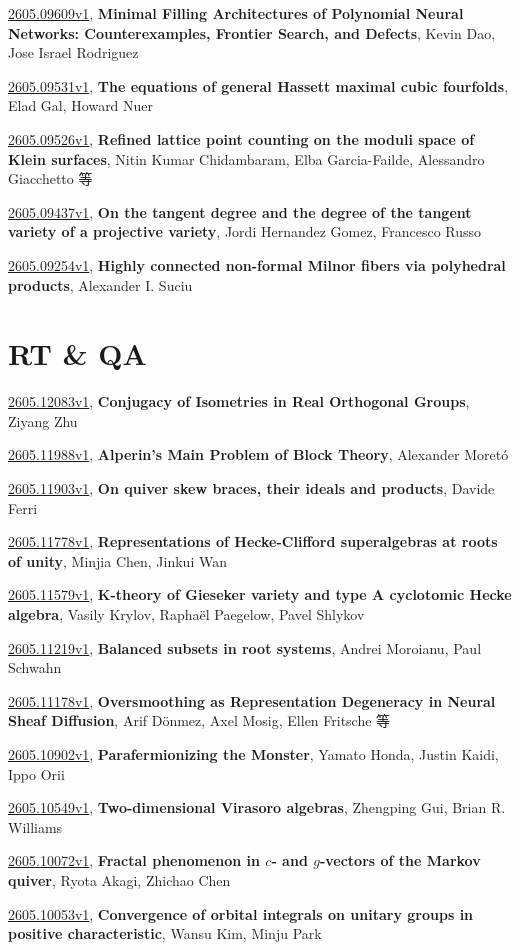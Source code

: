 \documentclass[9pt, a4paper]{article}
\theoremstyle{plain}
\theoremstyle{definition}
\theoremstyle{remark}
\newcommand{\arxiv}[3]{\href{https://arxiv.org/abs/#1}{#1}, \textbf{\textcolor{arxivblue}{#2}}, #3}
\begin{document}
\arxiv{2605.09609v1}{Minimal Filling Architectures of Polynomial Neural Networks: Counterexamples, Frontier Search, and Defects}{Kevin Dao, Jose Israel Rodriguez}

\arxiv{2605.09531v1}{The equations of general Hassett maximal cubic fourfolds}{Elad Gal, Howard Nuer}

\arxiv{2605.09526v1}{Refined lattice point counting on the moduli space of Klein surfaces}{Nitin Kumar Chidambaram, Elba Garcia-Failde, Alessandro Giacchetto 等}

\arxiv{2605.09437v1}{On the tangent degree and the degree of the tangent variety of a projective variety}{Jordi Hernandez Gomez, Francesco Russo}

\arxiv{2605.09254v1}{Highly connected non-formal Milnor fibers via polyhedral products}{Alexander I. Suciu}


\section{RT \& QA}
\arxiv{2605.12083v1}{Conjugacy of Isometries in Real Orthogonal Groups}{Ziyang Zhu}

\arxiv{2605.11988v1}{Alperin's Main Problem of Block Theory}{Alexander Moretó}

\arxiv{2605.11903v1}{On quiver skew braces, their ideals and products}{Davide Ferri}

\arxiv{2605.11778v1}{Representations of Hecke-Clifford superalgebras at roots of unity}{Minjia Chen, Jinkui Wan}

\arxiv{2605.11579v1}{K-theory of Gieseker variety and type A cyclotomic Hecke algebra}{Vasily Krylov, Raphaël Paegelow, Pavel Shlykov}

\arxiv{2605.11219v1}{Balanced subsets in root systems}{Andrei Moroianu, Paul Schwahn}

\arxiv{2605.11178v1}{Oversmoothing as Representation Degeneracy in Neural Sheaf Diffusion}{Arif Dönmez, Axel Mosig, Ellen Fritsche 等}

\arxiv{2605.10902v1}{Parafermionizing the Monster}{Yamato Honda, Justin Kaidi, Ippo Orii}

\arxiv{2605.10549v1}{Two-dimensional Virasoro algebras}{Zhengping Gui, Brian R. Williams}

\arxiv{2605.10072v1}{Fractal phenomenon in $c$- and $g$-vectors of the Markov quiver}{Ryota Akagi, Zhichao Chen}

\arxiv{2605.10053v1}{Convergence of orbital integrals on unitary groups in positive characteristic}{Wansu Kim, Minju Park}
\end{document}

